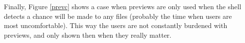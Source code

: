Finally, Figure \ref{prevc} shows a case when previews are only used when the
shell detects a chance will be made to any files (probably the time when users
are most uncomfortable). This way the users are not constantly burdened with
previews, and only shown then when they really matter.

